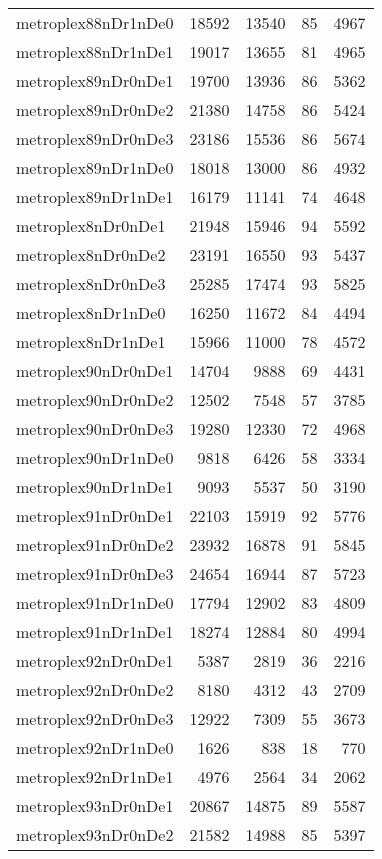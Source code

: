 \begin{longtable}{lrrrr}
metroplex88nDr1nDe0 & 18592 & 13540 & 85 & 4967 \\
metroplex88nDr1nDe1 & 19017 & 13655 & 81 & 4965 \\
metroplex89nDr0nDe1 & 19700 & 13936 & 86 & 5362 \\
metroplex89nDr0nDe2 & 21380 & 14758 & 86 & 5424 \\
metroplex89nDr0nDe3 & 23186 & 15536 & 86 & 5674 \\
metroplex89nDr1nDe0 & 18018 & 13000 & 86 & 4932 \\
metroplex89nDr1nDe1 & 16179 & 11141 & 74 & 4648 \\
metroplex8nDr0nDe1 & 21948 & 15946 & 94 & 5592 \\
metroplex8nDr0nDe2 & 23191 & 16550 & 93 & 5437 \\
metroplex8nDr0nDe3 & 25285 & 17474 & 93 & 5825 \\
metroplex8nDr1nDe0 & 16250 & 11672 & 84 & 4494 \\
metroplex8nDr1nDe1 & 15966 & 11000 & 78 & 4572 \\
metroplex90nDr0nDe1 & 14704 & 9888 & 69 & 4431 \\
metroplex90nDr0nDe2 & 12502 & 7548 & 57 & 3785 \\
metroplex90nDr0nDe3 & 19280 & 12330 & 72 & 4968 \\
metroplex90nDr1nDe0 & 9818 & 6426 & 58 & 3334 \\
metroplex90nDr1nDe1 & 9093 & 5537 & 50 & 3190 \\
metroplex91nDr0nDe1 & 22103 & 15919 & 92 & 5776 \\
metroplex91nDr0nDe2 & 23932 & 16878 & 91 & 5845 \\
metroplex91nDr0nDe3 & 24654 & 16944 & 87 & 5723 \\
metroplex91nDr1nDe0 & 17794 & 12902 & 83 & 4809 \\
metroplex91nDr1nDe1 & 18274 & 12884 & 80 & 4994 \\
metroplex92nDr0nDe1 & 5387 & 2819 & 36 & 2216 \\
metroplex92nDr0nDe2 & 8180 & 4312 & 43 & 2709 \\
metroplex92nDr0nDe3 & 12922 & 7309 & 55 & 3673 \\
metroplex92nDr1nDe0 & 1626 & 838 & 18 & 770 \\
metroplex92nDr1nDe1 & 4976 & 2564 & 34 & 2062 \\
metroplex93nDr0nDe1 & 20867 & 14875 & 89 & 5587 \\
metroplex93nDr0nDe2 & 21582 & 14988 & 85 & 5397 \\

\end{longtable}
